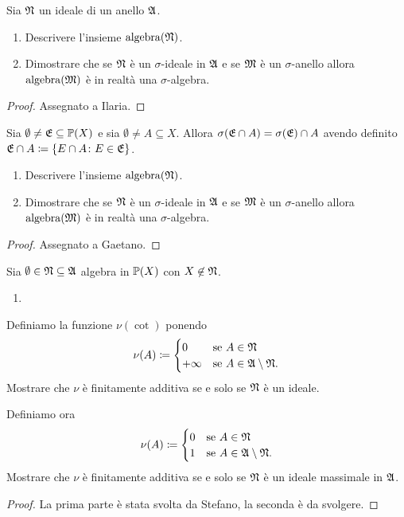 \documentclass[../EserciziIstituzioniAnalisi.tex]{subfiles}
\begin{document}
\begin{exercise}[13/10/2016]
Sia $\mathfrak N$ un ideale di un anello $\mathfrak A$.
\begin{enumerate}
\item Descrivere l'insieme $\operatorname{algebra}(\mathfrak N)$.
\item Dimostrare che se $\mathfrak N$ è un $\sigma$-ideale in $\mathfrak A$ e se $\mathfrak M$ è un $\sigma$-anello allora $\operatorname{algebra}(\mathfrak M)$ è in realtà una $\sigma$-algebra.
\end{enumerate}
\end{exercise}
\begin{proof}
  Assegnato a Ilaria.
\end{proof}

\begin{exercise}[2016-10-13]
Sia $\emptyset \neq \mathfrak E \subseteq \mathbb P(X)$ e sia $\emptyset \neq A \subseteq X$.
Allora $\sigma(\mathfrak E \cap A) = \sigma(\mathfrak E) \cap A$ avendo definito $\mathfrak E \cap A \coloneqq \left\lbrace E \cap A \colon E \in \mathfrak E\right\rbrace$.
\begin{enumerate}
\item Descrivere l'insieme $\operatorname{algebra}(\mathfrak N)$.
\item Dimostrare che se $\mathfrak N$ è un $\sigma$-ideale in $\mathfrak A$ e se $\mathfrak M$ è un $\sigma$-anello allora $\operatorname{algebra}(\mathfrak M)$ è in realtà una $\sigma$-algebra.
\end{enumerate}
\end{exercise}
\begin{proof}
Assegnato a Gaetano.
\end{proof}

\begin{exercise}[13/10/2016]
  Sia $\emptyset \in \mathfrak N \subseteq \mathfrak A$ algebra in $\mathbb P(X)$ con $X \not\in \mathfrak N$.
  \begin{enumerate}
  \item 
  \end{enumerate}
  Definiamo la funzione $\nu(\cot)$ ponendo 
  \begin{equation*}
    \nu(A) \coloneqq
    \begin{cases}
      0 & \text{se $A \in \mathfrak N$}\\
      +\infty & \text{se $A \in \mathfrak A\setminus \mathfrak N$}.
    \end{cases}
  \end{equation*}
  Mostrare che $\nu$ è finitamente additiva se e solo se $\mathfrak N$ è un ideale. 
\item Definiamo ora
  \begin{equation*}
    \nu(A) \coloneqq
    \begin{cases}
      0 & \text{se $A \in \mathfrak N$}\\
      1 & \text{se $A \in \mathfrak A\setminus \mathfrak N$}.
    \end{cases}
  \end{equation*}
  Mostrare che $\nu$ è finitamente additiva se e solo se $\mathfrak N$ è un ideale massimale in $\mathfrak A$.
\end{exercise}
\begin{proof}
  La prima parte è stata svolta da Stefano, la seconda è da svolgere.
\end{proof}
\end{document}
